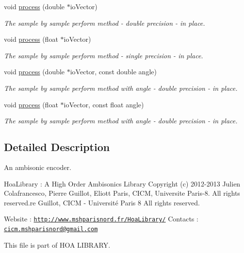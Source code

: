 \begin{DoxyCompactItemize}
void \hyperlink{class_ambisonic_encoder_a7e5cfedb354f5ad134aa19a76a1f61e6}{process} (double $\ast$io\-Vector)
\begin{DoxyCompactList}\small\item\em The sample by sample perform method -\/ double precision -\/ in place. \end{DoxyCompactList}\item 
void \hyperlink{class_ambisonic_encoder_ac8db5ffd1663fd64d8f8e9c701854088}{process} (float $\ast$io\-Vector)
\begin{DoxyCompactList}\small\item\em The sample by sample perform method -\/ single precision -\/ in place. \end{DoxyCompactList}\item 
void \hyperlink{class_ambisonic_encoder_ac68ce0e05589431e54efd91384787e79}{process} (double $\ast$io\-Vector, const double angle)
\begin{DoxyCompactList}\small\item\em The sample by sample perform method with angle -\/ double precision -\/ in place. \end{DoxyCompactList}\item 
void \hyperlink{class_ambisonic_encoder_ab77e6db3e31015c42a066f0f3a6e9a53}{process} (float $\ast$io\-Vector, const float angle)
\begin{DoxyCompactList}\small\item\em The sample by sample perform method with angle -\/ double precision -\/ in place. \end{DoxyCompactList}\end{DoxyCompactItemize}


\subsection{Detailed Description}
An ambisonic encoder. 

Hoa\-Library \-: A High Order Ambisonics Library Copyright (c) 2012-\/2013 Julien Colafrancesco, Pierre Guillot, Eliott Paris, C\-I\-C\-M, Universite Paris-\/8. All rights reserved.\-re Guillot, C\-I\-C\-M -\/ Université Paris 8 All rights reserved.

Website \-: \href{http://www.mshparisnord.fr/HoaLibrary/}{\tt http\-://www.\-mshparisnord.\-fr/\-Hoa\-Library/} Contacts \-: \href{mailto:cicm.mshparisnord@gmail.com}{\tt cicm.\-mshparisnord@gmail.\-com}

This file is part of H\-O\-A L\-I\-B\-R\-A\-R\-Y.

